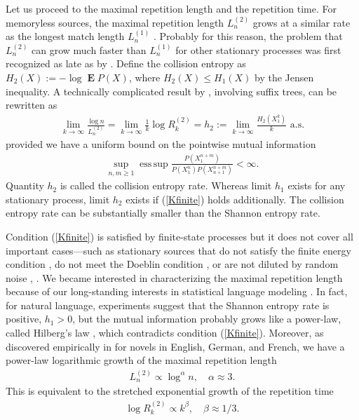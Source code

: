 \documentclass[a4paper,12pt]{article}
\DeclareMathOperator{\esssup}{ess\, sup}
\DeclareMathOperator{\mean}{\mathbf{E}}
\begin{document}
Let us proceed to the maximal repetition length and the repetition
time.  For memoryless sources, the maximal repetition length
$L^{(2)}_n$ grows at a similar rate as the longest match length
$L^{(1)}_n$ \citep{ErdosRenyi70,ArratiaWaterman89}. Probably for this
reason, the problem that $L^{(2)}_n$ can grow much faster than
$L^{(1)}_n$ for other stationary processes was first recognized as
late as by \citet{Shields92b,Shields97}. Define the collision entropy
as $H_2(X):=-\log\mean P(X)$, where $H_2(X)\le H_1(X)$ by the Jensen
inequality.  A technically complicated result by
\citet{Szpankowski93,Szpankowski93a}, involving suffix trees, can be
rewritten as
\begin{align}
  \label{Szpankowski}
  \lim_{k\to\infty} \frac{\log n}{L^{(2)}_n}
  =\lim_{k\to\infty} \frac{1}{k}\log R^{(2)}_k
  =h_2:=\lim_{k\to\infty} \frac{H_2(X_1^k)}{k}
  \text{ a.s.}
\end{align}
provided we have a uniform bound on the pointwise mutual information
\begin{align}
  \label{Kfinite}
  \sup_{n,m\ge 1}\esssup
     \frac{P(X_1^{n+m})}{P(X_1^n)P(X_{n+1}^{n+m})}
     < \infty.
\end{align}
Quantity $h_2$ is called the collision entropy rate. Whereas limit
$h_1$ exists for any stationary process, limit $h_2$ exists if
(\ref{Kfinite}) holds additionally. The collision entropy rate can be
substantially smaller than the Shannon entropy rate.

Condition (\ref{Kfinite}) is satisfied by finite-state processes
\citep[Theorem 11.3]{Debowski21} but it does not cover all important
cases---such as stationary sources that do not satisfy the finite
energy condition \citep{Shields92b,Shields97}, do not meet the
Doeblin condition \citep[Theorem 11.7]{Debowski21}, or are not diluted
by random noise \citep{Shields97}, \citep[Theorem 11.6]{Debowski21}.
We became interested in characterizing the maximal repetition length
because of our long-standing interests in statistical language
modeling \citep{Debowski21}.  In fact, for natural language,
experiments suggest that the Shannon entropy rate is positive,
$h_1>0$, \citep{Shannon51,CoverKing78,BehrOthers03} but the mutual
information probably grows like a power-law, called Hilberg's law
\citep{Hilberg90, TakahiraOthers16, KaplanOther20, Debowski21}, which
contradicts condition (\ref{Kfinite}). Moreover, as discovered
empirically in \citep{Debowski12b,Debowski15f} for novels in English,
German, and French, we have a power-law logarithmic growth of the
maximal repetition length
\begin{align}
  L^{(2)}_n\propto \log^\alpha n,\quad \alpha\approx 3.
\end{align}
This is equivalent to the stretched exponential growth of the
repetition time
\begin{align}
  \log R^{(2)}_k\propto k^\beta,\quad \beta\approx 1/3.
\end{align}
\end{document}
